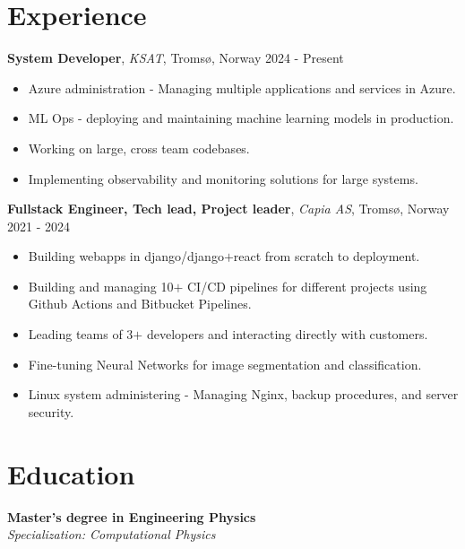 \documentclass[11pt, a4paper]{article}
\begin{document}
\section*{Experience}
\textbf{System Developer}, \textit{KSAT}, Tromsø, Norway \hfill 2024 - Present
\begin{itemize}[noitemsep]
    \item Azure administration - Managing multiple applications and services in Azure.
    \item ML Ops - deploying and maintaining machine learning models in production.
    \item Working on large, cross team codebases.
    \item Implementing observability and monitoring solutions for large systems.
\end{itemize}
\textbf{Fullstack Engineer, Tech lead, Project leader}, \textit{Capia AS}, Tromsø, Norway \hfill 2021 - 2024
\begin{itemize}[noitemsep]
    \item Building webapps in django/django$+$react from scratch to deployment.
    \item Building and managing 10$+$ CI/CD pipelines for different projects using Github Actions and Bitbucket Pipelines.
    \item Leading teams of 3$+$ developers and interacting directly with customers.
    \item Fine-tuning Neural Networks for image segmentation and classification.
    \item Linux system administering - Managing Nginx, backup procedures, and server security.
\end{itemize}

\section*{Education}
\textbf{Master's degree in Engineering Physics}\\
\textit{Specialization: Computational Physics}
\end{document}
